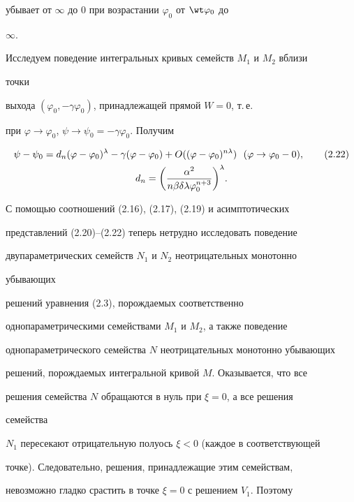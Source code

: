 убывает от $\infty$ до 0 при возрастании $\varphi_0$ от $\wt\varphi_0$ до 


$\infty$. 


 


Исследуем поведение интегральных кривых семейств $M_1$ и $M_2$ вблизи 


точки 


выхода $(\varphi_0,-\gamma\varphi_0)$, принадлежащей прямой $W=0$, т.\,е. 


при $\varphi\to\varphi_0$, $\psi\to\psi_0=-\gamma\varphi_0$. Получим 


\begin{gather} 


\psi-\psi_0=d_n(\varphi-\varphi_0)^\lambda-\gamma 


(\varphi-\varphi_0)+O((\varphi-\varphi_0)^{n\lambda}) 


\ \ (\varphi\to\varphi_0-0), \tag{2.22} \\ 


d_n=\bigg(\frac{\alpha^2}{n\beta\delta\lambda\varphi^{n+3}_0} 


\bigg)^\lambda.\notag 


\end{gather} 


С помощью соотношений (2.16), (2.17), (2.19) и асимптотических 


представлений (2.20)--(2.22) теперь нетрудно исследовать поведение 


двупараметрических семейств $N_1$ и $N_2$ неотрицательных монотонно 


убывающих 


решений уравнения (2.3), порождаемых соответственно 


однопараметрическими семействами $M_1$ и $M_2$, а также поведение 


однопараметрического семейства $N$ неотрицательных монотонно убывающих 


решений, порождаемых интегральной кривой $M$. Оказывается, что все 


решения семейства $N$ обращаются в нуль при $\xi=0$, а все решения 


семейства 


$N_1$ пересекают отрицательную полуось $\xi<0$ (каждое в соответствующей 


точке). Следовательно, решения, принадлежащие этим семействам, 


невозможно гладко срастить в точке $\xi=0$ с решением $V_1$. Поэтому 


